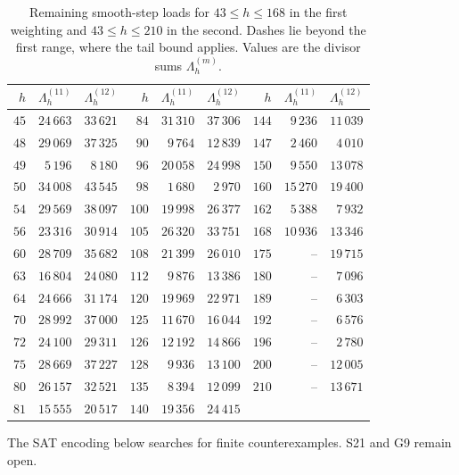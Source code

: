\documentclass[11pt,a4paper]{article}
\theoremstyle{definition}
\numberwithin{equation}{section}
\begin{document}
\begin{table}[!htbp]
	\centering
	\caption{Remaining smooth-step loads for $43\le h\le168$ in the first weighting and $43\le h\le210$ in the second. Dashes lie beyond the first range, where the tail bound applies. Values are the divisor sums $\Lambda_h^{(m)}$.}\label{tab:smooth}
	\begin{tabular}{@{}rrr@{\quad}rrr@{\quad}rrr@{}}
		\toprule $h$&$\Lambda_h^{(11)}$&$\Lambda_h^{(12)}$&$h$&$\Lambda_h^{(11)}$&$\Lambda_h^{(12)}$&$h$&$\Lambda_h^{(11)}$&$\Lambda_h^{(12)}$\\\midrule
		$45$ & $24\,663$ & $33\,621$ & $84$ & $31\,310$ & $37\,306$ & $144$ & $9\,236$ & $11\,039$ \\
		$48$ & $29\,069$ & $37\,325$ & $90$ & $9\,764$ & $12\,839$ & $147$ & $2\,460$ & $4\,010$ \\
		$49$ & $5\,196$ & $8\,180$ & $96$ & $20\,058$ & $24\,998$ & $150$ & $9\,550$ & $13\,078$ \\
		$50$ & $34\,008$ & $43\,545$ & $98$ & $1\,680$ & $2\,970$ & $160$ & $15\,270$ & $19\,400$ \\
		$54$ & $29\,569$ & $38\,097$ & $100$ & $19\,998$ & $26\,377$ & $162$ & $5\,388$ & $7\,932$ \\
		$56$ & $23\,316$ & $30\,914$ & $105$ & $26\,320$ & $33\,751$ & $168$ & $10\,936$ & $13\,346$ \\
		$60$ & $28\,709$ & $35\,682$ & $108$ & $21\,399$ & $26\,010$ & $175$ & -- & $19\,715$ \\
		$63$ & $16\,804$ & $24\,080$ & $112$ & $9\,876$ & $13\,386$ & $180$ & -- & $7\,096$ \\
		$64$ & $24\,666$ & $31\,174$ & $120$ & $19\,969$ & $22\,971$ & $189$ & -- & $6\,303$ \\
		$70$ & $28\,992$ & $37\,000$ & $125$ & $11\,670$ & $16\,044$ & $192$ & -- & $6\,576$ \\
		$72$ & $24\,100$ & $29\,311$ & $126$ & $12\,192$ & $14\,866$ & $196$ & -- & $2\,780$ \\
		$75$ & $28\,669$ & $37\,227$ & $128$ & $9\,936$ & $13\,100$ & $200$ & -- & $12\,005$ \\
		$80$ & $26\,157$ & $32\,521$ & $135$ & $8\,394$ & $12\,099$ & $210$ & -- & $13\,671$ \\
		$81$ & $15\,555$ & $20\,517$ & $140$ & $19\,356$ & $24\,415$ &  &  &  \\
		\bottomrule\end{tabular}\end{table}

The SAT encoding below searches for finite counterexamples. S21 and G9 remain open.
\end{document}
